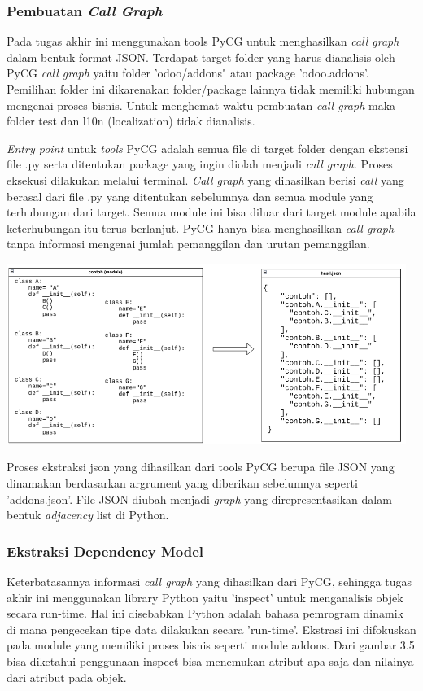 \subsubsection{Pembuatan \textit{Call Graph}}
Pada tugas akhir ini menggunakan tools PyCG untuk menghasilkan \textit{call graph} dalam bentuk format JSON. Terdapat target folder yang harus dianalisis oleh PyCG \textit{call graph} yaitu folder 'odoo/addons" atau package 'odoo.addons'. Pemilihan folder ini dikarenakan folder/package lainnya tidak memiliki hubungan mengenai proses bisnis. Untuk menghemat waktu pembuatan \textit{call graph} maka folder test dan l10n (localization) tidak dianalisis.  

\textit{Entry point} untuk \textit{tools} PyCG adalah semua file di target folder dengan ekstensi file .py serta ditentukan package yang ingin diolah menjadi \textit{call graph}. Proses eksekusi dilakukan melalui terminal. \textit{Call graph} yang dihasilkan berisi \textit{call} yang berasal dari file .py yang ditentukan sebelumnya dan semua module yang terhubungan dari target. Semua module ini bisa diluar dari target module apabila keterhubungan itu terus berlanjut. PyCG hanya bisa menghasilkan \textit{call graph} tanpa informasi mengenai jumlah pemanggilan dan urutan pemanggilan.

\begin{center}
	\includegraphics[width=13cm]{img/bab_3/soToCG.png}
	\label{contoh_json_pycg}
\end{center}

Proses ekstraksi json yang dihasilkan dari tools PyCG berupa file JSON yang dinamakan berdasarkan argrument yang diberikan sebelumnya seperti 'addons.json'. File JSON diubah menjadi \textit{graph} yang direpresentasikan dalam bentuk \textit{adjacency} list di Python.

\subsubsection{Ekstraksi Dependency Model}
Keterbatasannya informasi \textit{call graph} yang dihasilkan dari PyCG, sehingga tugas akhir ini menggunakan library Python yaitu 'inspect' untuk menganalisis objek secara run-time. Hal ini disebabkan Python adalah bahasa pemrogram dinamik di mana pengecekan tipe data dilakukan secara 'run-time'. Ekstrasi ini difokuskan pada module yang memiliki proses bisnis seperti module addons. Dari gambar 3.5 bisa diketahui penggunaan inspect bisa menemukan atribut apa saja dan nilainya dari atribut pada objek. 

